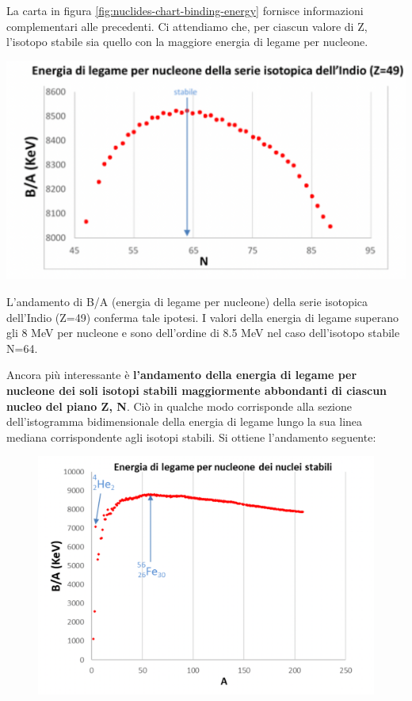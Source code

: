 La carta in figura \ref{fig:nuclides-chart-binding-energy} fornisce informazioni complementari alle precedenti.
Ci attendiamo che, per ciascun valore di Z, l’isotopo stabile sia quello con la maggiore energia di legame per nucleone.
\begin{marginfigure}
    \centering
    \includegraphics{../figs/indium-binding-energy}
    \label{fig:}
\end{marginfigure}
L’andamento di B/A (energia di legame per nucleone) della serie isotopica dell’Indio (Z=49) conferma tale ipotesi.
I valori della energia di legame superano gli 8 MeV per nucleone e sono dell’ordine di 8.5 MeV nel caso dell’isotopo stabile N=64.

Ancora più interessante è \textbf{l’andamento della energia di legame per nucleone dei soli isotopi stabili maggiormente
abbondanti di ciascun nucleo del piano Z, N}. 
Ciò in qualche modo corrisponde alla sezione dell’istogramma bidimensionale della energia di legame lungo la sua linea
mediana corrispondente agli isotopi stabili.
Si ottiene l’andamento seguente:
\begin{figure}
    \centering
    \includegraphics{../figs/binding-energy-stable}
    \label{fig:binding-energy-stable}
\end{figure}

